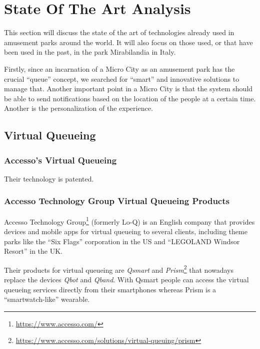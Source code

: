 \section{State Of The Art Analysis}\label{sec:state-of-the-art-analysis}
This section will discuss the state of the art of technologies already used in amusement parks around the world.
It will also focus on those used, or that have been used in the past, in the park Mirabilandia in Italy.

Firstly, since an incarnation of a Micro City as an amusement park has the crucial ``queue'' concept, we searched for ``smart''
and innovative solutions to manage that.
Another important point in a Micro City is that the system should be able to send notifications based on the location of
the people at a certain time.
Another is the personalization of the experience.

\subsection{Virtual Queueing}\label{subsec:virtual-queueing}
\subsubsection{Accesso's Virtual Queueing}
Their technology is patented.

\subsubsection{Accesso Technology Group Virtual Queueing Products}
Accesso Technology Group\footnote{\url{https://www.accesso.com/}} (formerly Lo-Q) is an English company that provides
devices and mobile apps for virtual queueing to several clients, including theme parks like the ``Six Flags'' corporation in the US
and ``LEGOLAND Windsor Resort'' in the UK\@.

Their products for virtual queueing are \textit{Qsmart} and \textit{Prism}\footnote{\url{https://www.accesso.com/solutions/virtual-queuing/prism}}
that nowadays replace the devices \textit{Qbot} and \textit{Qband}.
With Qsmart people can access the virtual queueing services directly from their smartphones whereas Prism is a ``smartwatch-like''
wearable.

